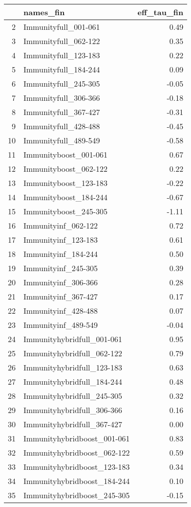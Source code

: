 \begin{table}[ht]
\centering
\begin{tabular}{rlr}
  \hline
 & names\_fin & eff\_tau\_fin \\ 
  \hline
2 & Immunityfull\_001-061 & 0.49 \\ 
  3 & Immunityfull\_062-122 & 0.35 \\ 
  4 & Immunityfull\_123-183 & 0.22 \\ 
  5 & Immunityfull\_184-244 & 0.09 \\ 
  6 & Immunityfull\_245-305 & -0.05 \\ 
  7 & Immunityfull\_306-366 & -0.18 \\ 
  8 & Immunityfull\_367-427 & -0.31 \\ 
  9 & Immunityfull\_428-488 & -0.45 \\ 
  10 & Immunityfull\_489-549 & -0.58 \\ 
  11 & Immunityboost\_001-061 & 0.67 \\ 
  12 & Immunityboost\_062-122 & 0.22 \\ 
  13 & Immunityboost\_123-183 & -0.22 \\ 
  14 & Immunityboost\_184-244 & -0.67 \\ 
  15 & Immunityboost\_245-305 & -1.11 \\ 
  16 & Immunityinf\_062-122 & 0.72 \\ 
  17 & Immunityinf\_123-183 & 0.61 \\ 
  18 & Immunityinf\_184-244 & 0.50 \\ 
  19 & Immunityinf\_245-305 & 0.39 \\ 
  20 & Immunityinf\_306-366 & 0.28 \\ 
  21 & Immunityinf\_367-427 & 0.17 \\ 
  22 & Immunityinf\_428-488 & 0.07 \\ 
  23 & Immunityinf\_489-549 & -0.04 \\ 
  24 & Immunityhybridfull\_001-061 & 0.95 \\ 
  25 & Immunityhybridfull\_062-122 & 0.79 \\ 
  26 & Immunityhybridfull\_123-183 & 0.63 \\ 
  27 & Immunityhybridfull\_184-244 & 0.48 \\ 
  28 & Immunityhybridfull\_245-305 & 0.32 \\ 
  29 & Immunityhybridfull\_306-366 & 0.16 \\ 
  30 & Immunityhybridfull\_367-427 & 0.00 \\ 
  31 & Immunityhybridboost\_001-061 & 0.83 \\ 
  32 & Immunityhybridboost\_062-122 & 0.59 \\ 
  33 & Immunityhybridboost\_123-183 & 0.34 \\ 
  34 & Immunityhybridboost\_184-244 & 0.10 \\ 
  35 & Immunityhybridboost\_245-305 & -0.15 \\ 
   \hline
\end{tabular}
\end{table}
